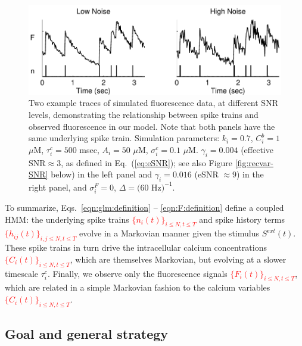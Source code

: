 \documentclass[aoas,preprint]{imsart}
\providecommand{\tr}[1]{\textcolor{red}{#1}}
\begin{document}
\begin{figure}
\centering \includegraphics[width=\hsize]{../figs/sim_examples}
\caption{Two example traces of simulated fluorescence data, at
  different SNR levels, demonstrating the relationship between spike
  trains and observed fluorescence in our model.  Note that both
  panels have the same underlying spike train. Simulation parameters:
  $k_i=0.7$, $C_i^b=1$ $\mu$M, $\tau^c_i=500$ msec, $A_i=50$ $\mu$M,
  $\sigma^c_i=0.1$ $\mu$M. $\gamma_i=0.004$ (effective SNR$ \approx
  3$, as defined in Eq.~(\ref{eq:eSNR}); see also Figure
  \ref{fig:recvar-SNR} below) in the left panel and $\gamma_i=0.016$
  (eSNR $\approx 9$) in the right panel, and $\sigma^F_i=0$,
  $\Delta=(60$ Hz$)^{-1}$.}
\label{fig:example_traces}
\end{figure}

To summarize, Eqs.~\eqref{eqn:glm:definition} -- \eqref{eqn:F:definition} define a coupled HMM: the underlying spike trains \tr{$\{n_i(t)\}_{i\leq N,t\leq T}$} and spike history terms \tr{$\{h_{ij}(t)\}_{i,j\leq N,t\leq T}$} evolve in a Markovian manner given the stimulus $S^{ext}(t)$. These spike trains in turn drive the intracellular calcium concentrations \tr{$\{C_i(t)\}_{i\leq N,t\leq T}$}, which are themselves Markovian, but evolving at a slower timescale $\tau_i^c$. Finally, we observe only the fluorescence signals \tr{$\{F_i(t)\}_{i\leq N,t\leq T}$}, which are related in a simple Markovian fashion to the calcium variables \tr{$\{C_i(t)\}_{i\leq N,t\leq T}$}.


\subsection{Goal and general strategy}  \label{sec:methods:goal}
\end{document}
